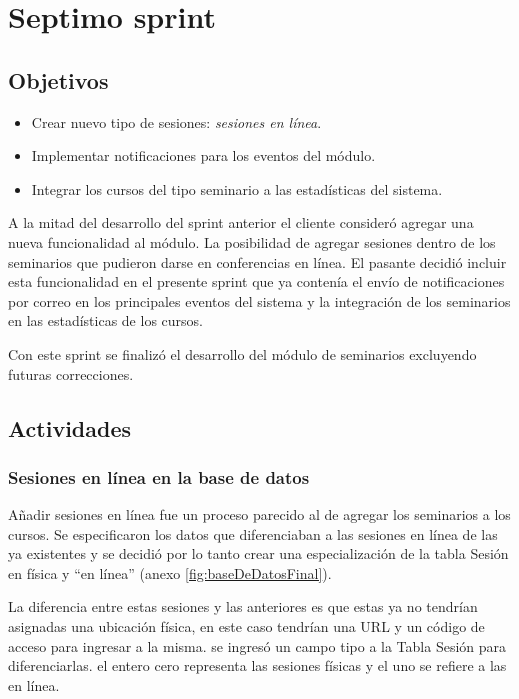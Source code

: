 ﻿\section{Septimo sprint} %
\label{sec:septimo_sprint}

\subsection{Objetivos}

\begin{itemize}
	\item Crear nuevo tipo de sesiones: \emph{sesiones en línea}.
	\item Implementar notificaciones para los eventos del módulo.
	\item Integrar los cursos del tipo seminario a las estadísticas del sistema.
\end{itemize}

A la mitad del desarrollo del sprint anterior el cliente consideró agregar una nueva funcionalidad al módulo. La posibilidad de agregar sesiones dentro de los seminarios que pudieron darse en conferencias en línea. El pasante decidió incluir esta funcionalidad en el presente sprint que ya contenía el envío de notificaciones por correo en los principales eventos del sistema y la integración de los seminarios en las estadísticas de los cursos.

Con este sprint se finalizó el desarrollo del módulo de seminarios excluyendo futuras correcciones.

\subsection{Actividades} %
\label{sub:actividades7}

\subsubsection{Sesiones en línea en la base de datos}

Añadir sesiones en línea fue un proceso parecido al de agregar los seminarios a los cursos. Se especificaron los datos que diferenciaban a las sesiones en línea de las ya existentes y se decidió por lo tanto crear una especialización de la tabla Sesión en física y ``en línea'' (anexo \ref{fig:baseDeDatosFinal}).

La diferencia entre estas sesiones y las anteriores es que estas ya no tendrían asignadas una ubicación física, en este caso tendrían una URL y un código de acceso para ingresar a la misma. se ingresó un campo tipo a la Tabla Sesión para diferenciarlas. el entero cero representa las sesiones físicas y el uno se refiere a las en línea.


